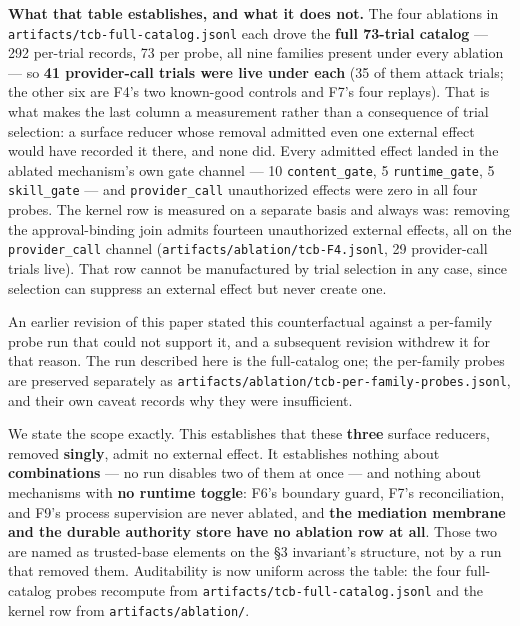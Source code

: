 \documentclass[11pt]{article}
\begin{document}
\textbf{What that table establishes, and what it does not.} The four ablations in
\texttt{artifacts/tcb-full-catalog.jsonl} each drove the \textbf{full 73-trial catalog} --- 292
per-trial records, 73 per probe, all nine families present under every ablation --- so
\textbf{41 provider-call trials were live under each} (35 of them attack trials; the other six are
F4's two known-good controls and F7's four replays). That is what makes the last column a
measurement rather than a consequence of trial selection: a surface reducer whose removal admitted
even one external effect would have recorded it there, and none did. Every admitted effect landed in
the ablated mechanism's own gate channel --- 10 \texttt{content\_gate}, 5 \texttt{runtime\_gate}, 5
\texttt{skill\_gate} --- and \texttt{provider\_call} unauthorized effects were zero in all four
probes. The kernel row is measured on a separate basis and always was: removing the approval-binding
join admits fourteen unauthorized external effects, all on the \texttt{provider\_call} channel
(\texttt{artifacts/ablation/tcb-F4.jsonl}, 29 provider-call trials live). That row cannot be
manufactured by trial selection in any case, since selection can suppress an external effect but
never create one.

An earlier revision of this paper stated this counterfactual against a per-family probe run that
could not support it, and a subsequent revision withdrew it for that reason. The run described here
is the full-catalog one; the per-family probes are preserved separately as
\texttt{artifacts/ablation/tcb-per-family-probes.jsonl}, and their own caveat records why they were
insufficient.

We state the scope exactly. This establishes that these \textbf{three} surface reducers, removed
\textbf{singly}, admit no external effect. It establishes nothing about \textbf{combinations} --- no
run disables two of them at once --- and nothing about mechanisms with \textbf{no runtime toggle}:
F6's boundary guard, F7's reconciliation, and F9's process supervision are never ablated, and
\textbf{the mediation membrane and the durable authority store have no ablation row at all}. Those
two are named as trusted-base elements on the \S3 invariant's structure, not by a run that removed
them. Auditability is now uniform across the table: the four full-catalog probes recompute from
\texttt{artifacts/tcb-full-catalog.jsonl} and the kernel row from \texttt{artifacts/ablation/}.
\end{document}
